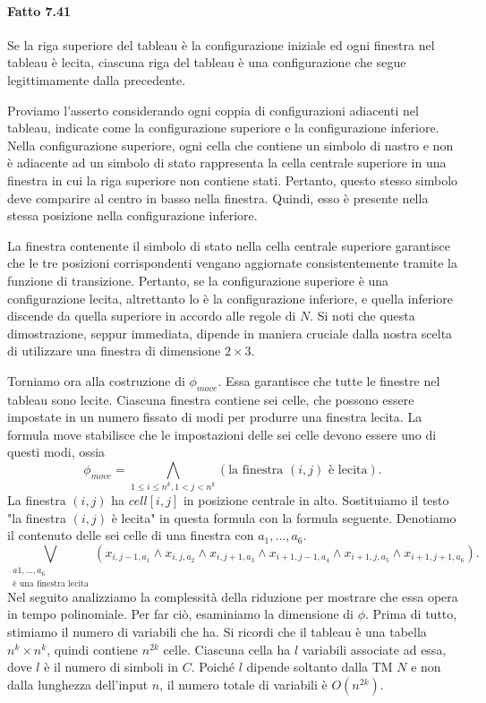 \documentclass{article}
\begin{document}
\text{}
\newline
\paragraph*{Fatto 7.41}
\label{fatto-7.41}
\vspace{1em}
\text{}
\newline
Se la riga superiore del tableau è la configurazione iniziale ed ogni finestra nel tableau è lecita, ciascuna riga del tableau è una configurazione che segue legittimamente dalla precedente.

\text{}
\newline
Proviamo l'asserto considerando ogni coppia di configurazioni adiacenti nel tableau, indicate come la configurazione superiore e la configurazione inferiore. 
Nella configurazione superiore, ogni cella che contiene un simbolo di nastro e non è adiacente ad un simbolo di stato rappresenta la cella centrale superiore in una finestra in cui la riga superiore non contiene stati. 
Pertanto, questo stesso simbolo deve comparire al centro in basso nella finestra.
Quindi, esso è presente nella stessa posizione nella configurazione inferiore.

La finestra contenente il simbolo di stato nella cella centrale superiore garantisce che le tre posizioni corrispondenti vengano aggiornate consistentemente tramite la funzione di transizione.
Pertanto, se la configurazione superiore è una configurazione lecita, altrettanto lo è la configurazione inferiore, e quella inferiore discende da quella superiore in accordo alle regole di $N$.
Si noti che questa dimostrazione, seppur immediata, dipende in maniera cruciale dalla nostra scelta di utilizzare una finestra di dimensione $2 \times 3$.

Torniamo ora alla costruzione di $\phi_{move}$.
Essa garantisce che tutte le finestre nel tableau sono lecite. 
Ciascuna finestra contiene sei celle, che possono essere impostate in un numero fissato di modi per produrre una finestra lecita.
La formula move stabilisce che le impostazioni delle sei celle devono essere uno di questi modi, ossia
$$
\phi_{move} = \bigwedge_{1 \leq i \leq n^k, 1<j<n^k} \left( \text{la finestra } (i,j) \text{ è lecita} \right).
$$
La finestra $(i,j)$ ha $cell[i,j]$ in posizione centrale in alto.
Sostituiamo il testo "la finestra $(i,j)$ è lecita" in questa formula con la formula seguente.
Denotiamo il contenuto delle sei celle di una finestra con $a_1,...,a_6$.
$$
\bigvee_{\substack{a1,...,a_6 \\ \text{è una finestra lecita}}} \left( x_{i,j-1,a_1} \land x_{i,j,a_2} \land x_{i,j+1,a_3} \land x_{i+1,j-1,a_4} \land x_{i+1,j,a_5} \land x_{i+1,j+1,a_6} \right).
$$
Nel seguito analizziamo la complessità della riduzione per mostrare che essa opera in tempo polinomiale. 
Per far ciò, esaminiamo la dimensione di $\phi$.
Prima di tutto, stimiamo il numero di variabili che ha. 
Si ricordi che il tableau è una tabella $n^k \times n^k$, quindi contiene $n^{2k}$ celle.
Ciascuna cella ha $l$ variabili associate ad essa, dove $l$ è il numero di simboli in $C$.
Poiché $l$ dipende soltanto dalla TM $N$ e non dalla lunghezza dell'input $n$, il numero totale di variabili è $O(n^{2k})$.
\end{document}
